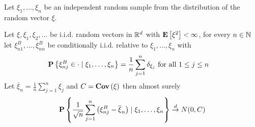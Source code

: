 Let $\xi_1, \dotsc, \xi_n$ be an independent random sample from the distribution of the random vector $\xi$.  
\begin{thm}
Let $\xi, \xi_1, \xi_2, \dotsc$ be i.i.d. random vectors in $\reals^d$
with $\expectation{\xi^2} < \infty$, for
every $n \in \naturals$ let $\xi^B_{n1}, \dotsc, \xi^B_{nn}$ be
conditionally i.i.d. relative to $\xi_1, \dotsc, \xi_n$ with 
\begin{align*}
\cprobability{\xi_1, \dotsc, \xi_n}{\xi^B_{nj} \in \cdot} &= \frac{1}{n} \sum_{j=1}^n \delta_{\xi_j} \text{ for all $1 \leq j \leq n$}
\end{align*}
Let $\overline{\xi}_n = \frac{1}{n} \sum_{j=1}^n \xi_j$ and $C = \covariance{\xi}$ then almost surely
\begin{align*}
\cprobability{\xi_1, \dotsc, \xi_n}{\frac{1}{\sqrt{n}} \sum_{j=1}^n \left( \xi^B_{nj} - \overline{\xi}_n \right) } \todist N(0, C)
\end{align*}
\end{thm}
